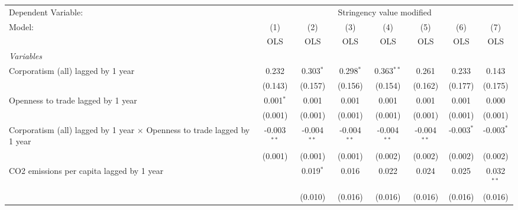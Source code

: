 
\begingroup
\centering
\begin{tabular}{lccccccc}
   \toprule
   Dependent Variable: & \multicolumn{7}{c}{Stringency value modified}\\
   Model:                                                                          & (1)           & (2)           & (3)           & (4)           & (5)           & (6)          & (7)\\  
                                                                                   &  OLS          & OLS           & OLS           & OLS           & OLS           & OLS          & OLS\\  
   \midrule
   \emph{Variables}\\
   Corporatism (all) lagged by 1 year                                              & 0.232         & 0.303$^{*}$   & 0.298$^{*}$   & 0.363$^{**}$  & 0.261         & 0.233        & 0.143\\   
                                                                                   & (0.143)       & (0.157)       & (0.156)       & (0.154)       & (0.162)       & (0.177)      & (0.175)\\   
   Openness to trade lagged by 1 year                                              & 0.001$^{*}$   & 0.001         & 0.001         & 0.001         & 0.001         & 0.001        & 0.000\\   
                                                                                   & (0.001)       & (0.001)       & (0.001)       & (0.001)       & (0.001)       & (0.001)      & (0.001)\\   
   Corporatism (all) lagged by 1 year $\times$ Openness to trade lagged by 1 year  & -0.003$^{**}$ & -0.004$^{**}$ & -0.004$^{**}$ & -0.004$^{**}$ & -0.004$^{**}$ & -0.003$^{*}$ & -0.003$^{*}$\\   
                                                                                   & (0.001)       & (0.001)       & (0.001)       & (0.002)       & (0.002)       & (0.002)      & (0.002)\\   
   CO2 emissions per capita lagged by 1 year                                       &               & 0.019$^{*}$   & 0.016         & 0.022         & 0.024         & 0.025        & 0.032$^{**}$\\   
                                                                                   &               & (0.010)       & (0.016)       & (0.016)       & (0.016)       & (0.016)      & (0.016)\\   

\end{tabular}
